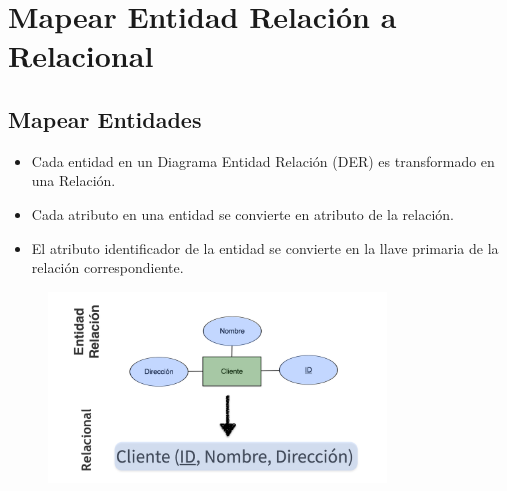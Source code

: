 \documentclass[12pt, fleqn]{report}                             %
\theoremstyle{break}                                            %
\begin{document}
        \clearpage
        \section{Mapear Entidad Relación a Relacional}

            
            \subsection{Mapear Entidades}

                \begin{itemize}
                    \item Cada entidad en un Diagrama Entidad Relación (DER) es transformado en
                        una Relación.

                    \item Cada atributo en una entidad se convierte en atributo de la relación.

                    \item El atributo identificador de la entidad se convierte en la llave primaria
                        de la relación correspondiente.
                \end{itemize}

                \begin{figure}[h]
                    \centering
                    \includegraphics[width=0.8\textwidth]{MapeoEntidad}
                \end{figure}


            \clearpage
\end{document}
